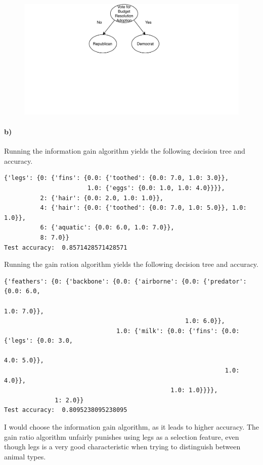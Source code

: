 \documentclass[12pt]{article}
\begin{document}
\begin{figure}[H]
    \begin{center}
        \includegraphics[width=4.5in]{DecisionTreeSimplified.pdf}
    \end{center}
\end{figure}

\paragraph{b)}

Running the information gain algorithm yields the following decision tree and accuracy.
\scriptsize
\begin{verbatim}
{'legs': {0: {'fins': {0.0: {'toothed': {0.0: 7.0, 1.0: 3.0}},
                       1.0: {'eggs': {0.0: 1.0, 1.0: 4.0}}}},
          2: {'hair': {0.0: 2.0, 1.0: 1.0}},
          4: {'hair': {0.0: {'toothed': {0.0: 7.0, 1.0: 5.0}}, 1.0: 1.0}},
          6: {'aquatic': {0.0: 6.0, 1.0: 7.0}},
          8: 7.0}}
Test accuracy:  0.8571428571428571
\end{verbatim}
\normalsize
Running the gain ration algorithm yields the following decision tree and accuracy.
\scriptsize
\begin{verbatim}
{'feathers': {0: {'backbone': {0.0: {'airborne': {0.0: {'predator': {0.0: 6.0,
                                                                     1.0: 7.0}},
                                                  1.0: 6.0}},
                               1.0: {'milk': {0.0: {'fins': {0.0: {'legs': {0.0: 3.0,
                                                                            4.0: 5.0}},
                                                             1.0: 4.0}},
                                              1.0: 1.0}}}},
              1: 2.0}}
Test accuracy:  0.8095238095238095
\end{verbatim}
\normalsize
I would choose the information gain algorithm, as it leads to higher accuracy. The gain
ratio algorithm unfairly punishes using legs as a selection feature, even though legs
is a very good characteristic when trying to distinguish between animal types.
\end{document}
